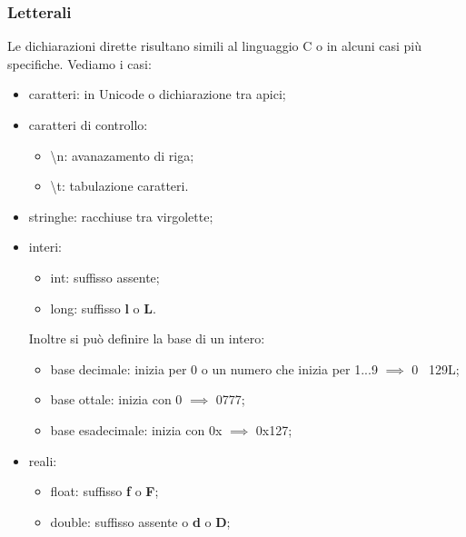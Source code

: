 \documentclass{subfiles}
\begin{document}
    \subsubsection{Letterali}
    Le dichiarazioni dirette risultano simili al linguaggio C o in alcuni casi più specifiche. Vediamo i casi:
    \begin{itemize}
        \item caratteri: in Unicode o dichiarazione tra apici;
        \item caratteri di controllo:   
        \begin{itemize}
            \item \textbackslash n: avanazamento di riga;
            \item \textbackslash t: tabulazione caratteri.
        \end{itemize} 
        \item stringhe: racchiuse tra virgolette;
        \item interi:
        \begin{itemize}
            \item int: suffisso assente;
            \item long: suffisso \textbf{l} o \textbf{L}.
        \end{itemize}
        Inoltre si può definire la base di un intero:
        \begin{itemize}
            \item base decimale: inizia per 0 o un numero che inizia per 1...9 \(\implies\) 0 \ 129L;
            \item base ottale: inizia con 0 \(\implies\) 0777;
            \item base esadecimale: inizia con 0x \(\implies\) 0x127;
        \end{itemize}
        \item reali:
        \begin{itemize}
            \item float: suffisso \textbf{f} o \textbf{F};
            \item double: suffisso assente o \textbf{d} o \textbf{D};
        \end{itemize}
    
    \end{itemize}
\end{document}
